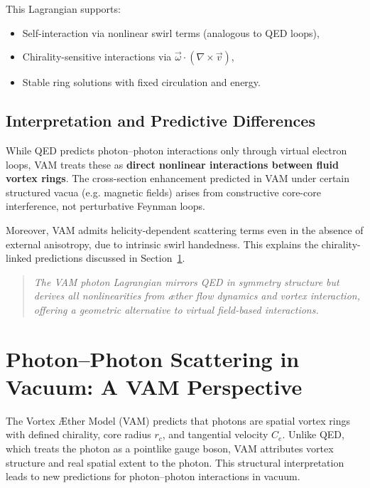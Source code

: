     This Lagrangian supports:
    \begin{itemize}
        \item Self-interaction via nonlinear swirl terms (analogous to QED loops),
        \item Chirality-sensitive interactions via \( \vec{\omega} \cdot (\nabla \times \vec{v}) \),
        \item Stable ring solutions with fixed circulation and energy.
    \end{itemize}

    \subsection{Interpretation and Predictive Differences}

    While QED predicts photon–photon interactions only through virtual electron loops, VAM treats these as \textbf{direct nonlinear interactions between fluid vortex rings}. The cross-section enhancement predicted in VAM under certain structured vacua (e.g. magnetic fields) arises from constructive core-core interference, not perturbative Feynman loops.

    Moreover, VAM admits helicity-dependent scattering terms even in the absence of external anisotropy, due to intrinsic swirl handedness. This explains the chirality-linked predictions discussed in Section~\ref{sec:photon-scattering}.

    \begin{quote}
        \emph{The VAM photon Lagrangian mirrors QED in symmetry structure but derives all nonlinearities from æther flow dynamics and vortex interaction, offering a geometric alternative to virtual field-based interactions.}
    \end{quote}


\section{Photon–Photon Scattering in Vacuum: A VAM Perspective}\label{sec:photon-scattering}

        The Vortex \AE ther Model (VAM) predicts that photons are spatial vortex rings with defined chirality, core radius \( r_c \), and tangential velocity \( C_e \). Unlike QED, which treats the photon as a pointlike gauge boson, VAM attributes vortex structure and real spatial extent to the photon. This structural interpretation leads to new predictions for photon–photon interactions in vacuum.

